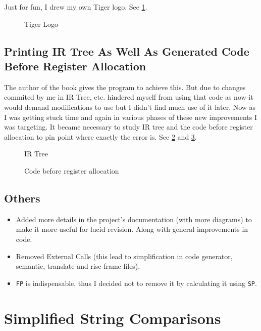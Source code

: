 Just for fun, I drew my own Tiger logo. See \ref{fig:tig}.

\begin{figure}
\centering
{}
\caption{Tiger Logo}
\label{fig:tig}
\end{figure}

\subsection{Printing IR Tree As Well As Generated Code Before Register Allocation}

The author of the book gives the program to achieve this. But due to changes commited by me in IR Tree, etc. hindered myself from using that code as now it would demand modifications to use but I didn't find much use of it later. Now as I was getting stuck time and again in various phases of these new improvements I was targeting. It became necessary to study IR tree and the code before register allocation to pin point where exactly the error is. See \ref{fig:ir} and \ref{fig:ba}.

\begin{figure}
\centering
{}
\caption{IR Tree}
\label{fig:ir}
\end{figure}


\begin{figure}
\centering
{}
\caption{Code before register allocation}
\label{fig:ba}
\end{figure}

\subsection{Others}

\begin{itemize}
  \item Added more details in the project’s documentation (with more diagrams) to make it more useful for lucid revision. Along with general improvements in code.
  \item Removed External Calls (this lead to simplification in code generator, semantic, translate and risc frame files).
  \item \texttt{FP} is indispensable, thus I decided not to remove it by calculating it using \texttt{SP}.
\end{itemize}

\section{Simplified String Comparisons}

